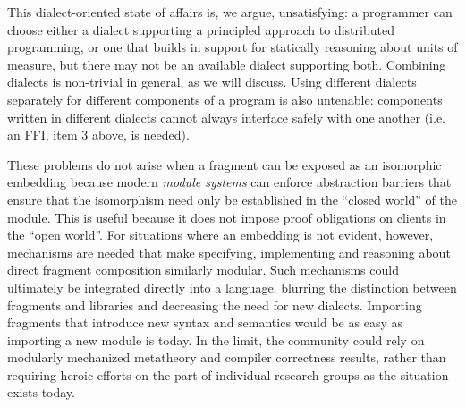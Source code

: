 \documentclass[9pt,preprint]{sigplanconf}
\begin{document}
This dialect-oriented state of affairs is, we argue, unsatisfying: a programmer can choose either a dialect supporting a principled approach to distributed programming, or one that builds in support for statically reasoning about units of measure, but there may not be an available dialect supporting both. Combining dialects is non-trivial in general, as we will discuss. Using different dialects separately for different components of a program is also untenable: components written in different dialects cannot always interface safely with one another (i.e. an FFI, item 3  above, is needed). 

These problems do not arise when a fragment can be exposed as an isomorphic embedding because modern \emph{module systems} can enforce abstraction barriers that ensure that the isomorphism need only be established in the ``closed world'' of the module. This is useful because it does not impose proof obligations on clients in the ``open world''.  %
For situations where an embedding is not evident, however, mechanisms are needed that make specifying, implementing and reasoning about direct fragment composition similarly modular. Such mechanisms could ultimately be integrated directly into a language, blurring the distinction between fragments and libraries and decreasing the need for new dialects. Importing fragments that introduce new syntax and semantics   would be as easy as importing a new module is today. In the limit, the community could rely on modularly mechanized metatheory and compiler correctness results, rather than requiring heroic efforts on the part of individual research groups as the situation exists today. %
\end{document}
